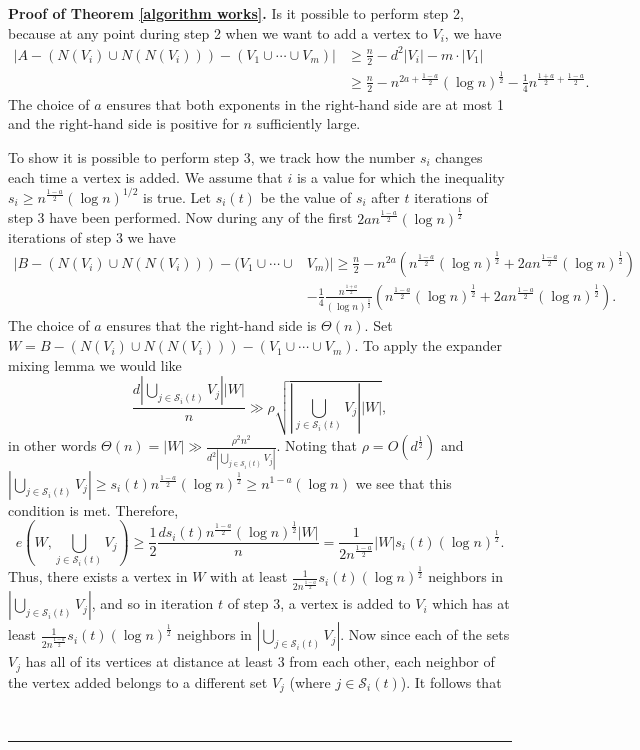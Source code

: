\documentclass[10pt,a4paper]{amsart}
\newenvironment{proof}[1][Proof]{\noindent\textbf{#1.} }
{\hfill \ \rule{0.5em}{0.5em}}
\begin{document}
\begin{proof}[Proof of Theorem \ref{algorithm works}] Is it possible to perform step 2, because at any point during step 2 when we want to add a vertex to $V_i$, we have
$$
\begin{aligned}
    |A-(N(V_i)\cup N(N(V_i)))-(V_1\cup\cdots\cup V_m)|&\ge\frac{n}{2}-d^2|V_i|-m\cdot|V_1|\\ &\ge \frac{n}{2}-n^{2a+\frac{1-a}{2}}(\log n)^{\frac{1}{2}}-\frac{1}{4}n^{\frac{1+a}{2}+\frac{1-a}{2}}.
\end{aligned}$$
The choice of $a$ ensures that both exponents in the right-hand side are at most 1 and the right-hand side is positive for $n$ sufficiently large.

To show it is possible to perform step 3, we track how the number $s_i$ changes each time a vertex is added. 
We assume that $i$ is a value for which the inequality 
$s_i \geq n^{ \frac{1-a}{2} } ( \log n )^{1/2}$
is true.  
Let $s_i(t)$ be the value of $s_i$ after $t$ iterations of step 3 have been performed. Now during any of the first $2an^{\frac{1-a}{2}}(\log n)^{\frac{1}{2}}$ iterations of step 3 we have
$$\begin{aligned}|B-(N(V_i)\cup N(N(V_i)))-(V_1\cup\cdots\cup& V_m)|\ge  \frac{n}{2}-n^{2a}(n^\frac{1-a}{2}(\log n)^{\frac{1}{2}}+2an^{\frac{1-a}{2}}(\log n)^{\frac{1}{2}})\\
&-\frac{1}{4}\frac{n^{\frac{1+a}{2}}}{(\log n)^{\frac{1}{2}}}(n^\frac{1-a}{2}(\log n)^{\frac{1}{2}}+2an^{\frac{1-a}{2}}(\log n)^{\frac{1}{2}}).\end{aligned}$$
The choice of $a$ ensures that the right-hand side is $\Theta(n)$. Set $W=B-(N(V_i)\cup N(N(V_i)))-(V_1\cup\cdots\cup V_m)$. To apply the expander mixing lemma we would like
$$\frac{d\left|\bigcup_{j\in\mathcal S_i(t)}V_j\right||W|}{n}\gg\rho\sqrt{\left|\bigcup_{j\in\mathcal S_i(t)}V_j\right||W|},$$
in other words $\Theta(n)=|W|\gg\frac{\rho^2n^2}{d^2\left|\bigcup_{j\in\mathcal S_i(t)}V_j\right|}$. Noting that 
$\rho= O (d^{\frac{1}{2}})$ 
and $\left|\bigcup_{j\in\mathcal S_i(t)}V_j\right|\ge s_i(t)n^{\frac{1-a}{2}}(\log n)^{\frac{1}{2}}\ge n^{1-a}(\log n)$ we see that this condition is met. Therefore,
$$e\left(W,\bigcup_{j\in\mathcal S_i(t)}V_j\right)\ge\frac{1}{2}\frac{ds_i(t)n^{\frac{1-a}{2}}(\log n)^{\frac{1}{2}}|W|}{n}=\frac{1}{2n^\frac{1-a}{2}}|W|s_i(t)(\log n)^{\frac{1}{2}}.$$
Thus, there exists a vertex in $W$ with at least $\frac{1}{2n^\frac{1-a}{2}}s_i(t)(\log n)^{\frac{1}{2}}$ neighbors in $\left|\bigcup_{j\in\mathcal S_i(t)}V_j\right|$, and so in iteration $t$ of step 3, a vertex is added to $V_i$ which has at least $\frac{1}{2n^{\frac{1-a}{2}}}s_i(t)(\log n)^{\frac{1}{2}}$ neighbors in $\left|\bigcup_{j\in\mathcal S_i(t)}V_j\right|$. Now since each of the sets $V_j$ has all of its vertices at distance at least 3 from each other, each neighbor of the vertex added belongs to a different set $V_j$ (where $j\in\mathcal S_i(t)$). It follows that

\end{proof}
\end{document}
